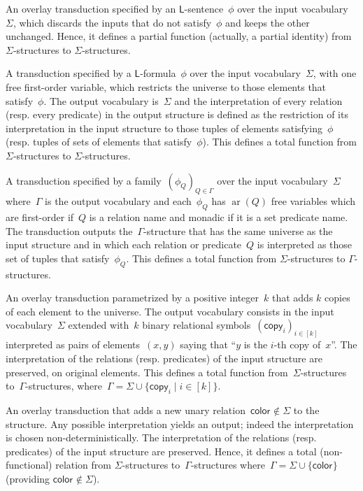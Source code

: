 \documentclass{lmcs} %
\newcommand{\arity}{\operatorname{ar}}
\newcommand{\copyV}[1][]{\ensuremath{\mathsf{copy}_{#1}}\xspace}
\newcommand{\colorV}[1][]{\ensuremath{\mathsf{color}_{#1}}\xspace}
\newcommand{\resp}{resp.\xspace}
\begin{document}
\begin{description}[nosep]
    \item[Filtering]
        An overlay transduction
        specified by an $\mathsf{L}$-sentence~$\phi$ over the input vocabulary~$\Sigma$,
        which discards the inputs that do not satisfy~$\phi$
        and keeps the other unchanged.
        Hence, it defines a partial function
        (actually, a partial identity)
        from $\Sigma$-structures to $\Sigma$-structures.
    \item[Universe restriction]
        A transduction specified by a $\mathsf{L}$-formula~$\phi$ over the input vocabulary~$\Sigma$,
        with one free first-order variable,
        which restricts the universe to those elements that satisfy~$\phi$.
        The output vocabulary is~$\Sigma$
        and the interpretation of every relation (\resp every predicate) in the output structure
        is defined as the restriction of its interpretation in the input structure
        to those tuples of elements satisfying~$\phi$ (\resp tuples of sets of elements that satisfy~$\phi$).
        This defines a total function from $\Sigma$-structures to $\Sigma$-structures.
    \item[Interpretation]
        A transduction specified by a family~$(\phi_Q)_{Q\in\Gamma}$ over the input vocabulary~$\Sigma$
        where~$\Gamma$ is the output vocabulary and each~$\phi_Q$ has $\arity(Q)$ free variables
        which are first-order if~$Q$ is a relation name and monadic if it is a set predicate name.
        The transduction outputs the~$\Gamma$-structure
        that has the same universe as the input structure
        and in which each relation or predicate~$Q$ is interpreted
        as those set of tuples that satisfy~$\phi_Q$.
        This defines a total function from $\Sigma$-structures to $\Gamma$-structures.
    \item[Copying]
        An overlay transduction parametrized by a positive integer~$k$ that
        adds $k$ copies of each element to the universe.
        The output vocabulary consists in the input vocabulary~$\Sigma$
        extended with~$k$ binary relational symbols~$(\copyV[i])_{i\in[k]}$
        interpreted as pairs of elements~$(x,y)$
        saying that ``$y$ is the $i$-th copy of~$x$''.
        The interpretation of the relations (\resp predicates) of the input structure
        are preserved, on original elements.
        This defines a total function from~$\Sigma$-structures to~$\Gamma$-structures,
        where~$\Gamma=\Sigma\cup\{\copyV[i]\mid i\in[k]\}$.
    \item[Colouring]
        An overlay transduction that adds a new unary relation~$\colorV\notin\Sigma$ to the structure.
        Any possible interpretation yields an output;
        indeed the interpretation is chosen non-deterministically.
        The interpretation of the relations (\resp predicates) of the input structure
        are preserved.
        Hence, it defines a total (non-functional) relation
        from $\Sigma$-structures to~$\Gamma$-structures
        where~$\Gamma=\Sigma\cup\{\colorV\}$ (providing $\colorV\notin\Sigma$).
\end{description}
\end{document}
